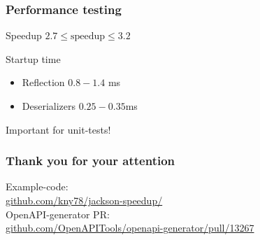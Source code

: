 \documentclass{beamer}
\begin{document}
    \begin{frame}
        \frametitle{Performance testing}

        \begin{block}{Speedup}
            $2.7 \le \textrm{speedup} \le 3.2$
        \end{block}
        \begin{block}{Startup time}

            \begin{itemize}
                \item Reflection $0.8 - 1.4$ ms
                \item Deserializers $0.25 - 0.35$ms
            \end{itemize}

            Important for unit-tests!
        \end{block}

    \end{frame}


    \begin{frame}
        \frametitle{Thank you for your attention}
        Example-code:\\
        \href{https://github.com/kny78/jackson-speedup/}{github.com/kny78/jackson-speedup/}\\[1,0cm]
        OpenAPI-generator PR: \\
        \href{https://github.com/OpenAPITools/openapi-generator/pull/13267}{github.com/OpenAPITools/openapi-generator/pull/13267}\\
    \end{frame}
\end{document}

